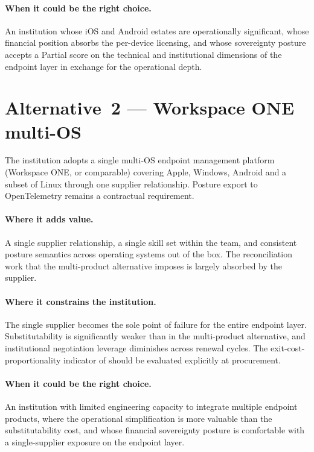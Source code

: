 \paragraph{When it could be the right choice.} An institution
whose iOS and Android estates are operationally significant, whose
financial position absorbs the per-device licensing, and whose
sovereignty posture accepts a Partial score on the technical and
institutional dimensions of the endpoint layer in exchange for the
operational depth.

\section{Alternative~2 --- Workspace ONE multi-OS}
\label{sec:ep-alt2}

\begin{alternativebox}
\noindent The institution adopts a single multi-OS endpoint
management platform (Workspace ONE, or comparable) covering Apple,
Windows, Android and a subset of Linux through one supplier
relationship. Posture export to OpenTelemetry remains a contractual
requirement.
\end{alternativebox}

\paragraph{Where it adds value.} A single supplier relationship,
a single skill set within the team, and consistent posture semantics
across operating systems out of the box. The reconciliation work
that the multi-product alternative imposes is largely absorbed by
the supplier.

\paragraph{Where it constrains the institution.} The single supplier
becomes the sole point of failure for the entire endpoint layer.
Substitutability is significantly weaker than in the multi-product
alternative, and institutional negotiation leverage diminishes
across renewal cycles. The exit-cost-proportionality indicator of
 should be evaluated explicitly at
procurement.

\paragraph{When it could be the right choice.} An institution with
limited engineering capacity to integrate multiple endpoint
products, where the operational simplification is more valuable
than the substitutability cost, and whose financial sovereignty
posture is comfortable with a single-supplier exposure on the
endpoint layer.

